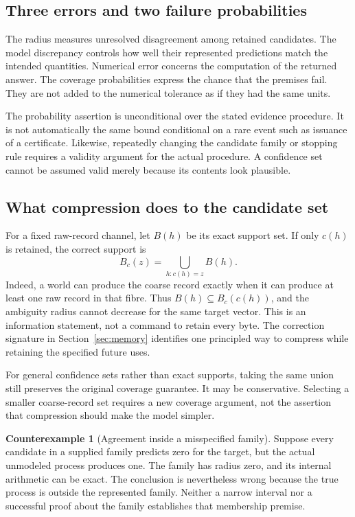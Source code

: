 \documentclass[11pt,letterpaper]{article}
\theoremstyle{plain}
\theoremstyle{definition}
\newtheorem{counterexample}[theorem]{Counterexample}
\begin{document}
\subsection{Three errors and two failure probabilities}
The radius measures unresolved disagreement among retained candidates. The model discrepancy controls how well their represented predictions match the intended quantities. Numerical error concerns the computation of the returned answer. The coverage probabilities express the chance that the premises fail. They are not added to the numerical tolerance as if they had the same units.

The probability assertion is unconditional over the stated evidence procedure. It is not automatically the same bound conditional on a rare event such as issuance of a certificate. Likewise, repeatedly changing the candidate family or stopping rule requires a validity argument for the actual procedure. A confidence set cannot be assumed valid merely because its contents look plausible.

\subsection{What compression does to the candidate set}
For a fixed raw-record channel, let $B(h)$ be its exact support set. If only $c(h)$ is retained, the correct support is
\[
B_c(z)=\bigcup_{h:c(h)=z}B(h).
\]
Indeed, a world can produce the coarse record exactly when it can produce at least one raw record in that fibre. Thus $B(h)\subseteq B_c(c(h))$, and the ambiguity radius cannot decrease for the same target vector. This is an information statement, not a command to retain every byte. The correction signature in Section~\ref{sec:memory} identifies one principled way to compress while retaining the specified future uses.

For general confidence sets rather than exact supports, taking the same union still preserves the original coverage guarantee. It may be conservative. Selecting a smaller coarse-record set requires a new coverage argument, not the assertion that compression should make the model simpler.

\begin{counterexample}[Agreement inside a misspecified family]\label{ce:misspec}
Suppose every candidate in a supplied family predicts zero for the target, but the actual unmodeled process produces one. The family has radius zero, and its internal arithmetic can be exact. The conclusion is nevertheless wrong because the true process is outside the represented family. Neither a narrow interval nor a successful proof about the family establishes that membership premise.
\end{counterexample}
\end{document}
